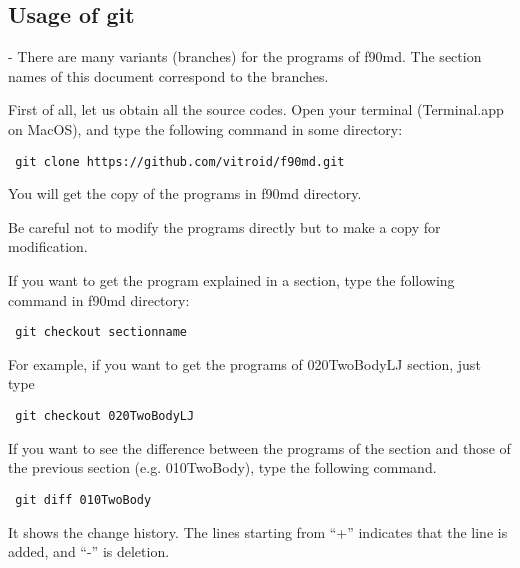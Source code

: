 \subsection{Usage of git}
-%
There are many variants (branches) for the programs of f90md.  The section names of this document correspond to the branches.

First of all, let us obtain all the source codes.  Open your terminal (Terminal.app on MacOS), and type the following command in some directory:
\begin{screen}
\begin{verbatim}
 git clone https://github.com/vitroid/f90md.git
\end{verbatim}
\end{screen}
You will get the copy of the programs in f90md directory.

\begin{shadebox}
   Be careful not to modify the programs directly but to make  a copy for modification. %
\end{shadebox}

If you want to get the program explained in a section, type the following command in f90md directory:
\begin{screen}
\begin{verbatim}
 git checkout sectionname
\end{verbatim}
\end{screen}

For example, if you want to get the programs of 020TwoBodyLJ section, just type
\begin{screen}
\begin{verbatim}
 git checkout 020TwoBodyLJ
\end{verbatim}
\end{screen}

If you want to see the difference between the programs of the section and those of the previous section (e.g. 010TwoBody), type the following command.
\begin{screen}
\begin{verbatim}
 git diff 010TwoBody
\end{verbatim}
\end{screen}
It shows the change history.  The lines starting from ``+'' indicates that the line is added, and ``-'' is deletion.
